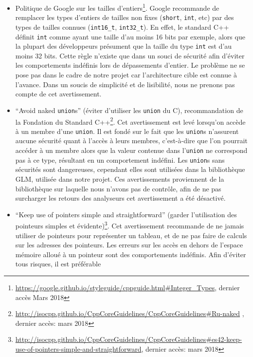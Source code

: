 \begin{itemize}
\item
  Politique de Google sur les tailles
  d'entiers\footnote{\url{https://google.github.io/styleguide/cppguide.html\#Integer_Types}, dernier accès Mars 2018}. Google recommande de remplacer
  les types d'entiers de tailles non fixes (\texttt{short},
  \texttt{int}, etc) par des types de tailles connues
  (\texttt{int16\_t}, \texttt{int32\_t}). En effet, le standard C++
  définit \texttt{int} comme ayant une taille d'au moins 16 bits par
  exemple, alors que la plupart des développeurs présument que la taille
  du type \texttt{int} est d'au moins 32 bits. Cette règle n'existe que
  dans un souci de sécurité afin d'éviter les comportements indéfinis
  lors de dépassements d'entier. Le problème ne se pose pas dans le cadre
  de notre projet car l'architecture cible est connue à l'avance. Dans
  un soucis de simplicité et de lisibilité, nous ne prenons pas compte
  de cet avertissement.
\item
  ``Avoid naked \texttt{union}s'' (éviter d'utiliser les \texttt{union}
  du C), recommandation de la Fondation du Standard
  C++\footnote{\url{http://isocpp.github.io/CppCoreGuidelines/CppCoreGuidelines\#Ru-naked} , dernier accès: mars 2018}. Cet avertissement est levé
  lorsqu'on accède à un membre d'une \texttt{union}. Il est fondé sur le
  fait que les \texttt{union}s n'assurent aucune sécurité quant à
  l'accès à leurs membres, c'est-à-dire que l'on pourrait accéder à un
  membre alors que la valeur contenue dans l'\texttt{union} ne
  correspond pas à ce type, résultant en un comportement indéfini. Les
  \texttt{union}s sans sécurités sont dangereuses, cependant elles sont
  utilisées dans la bibliothèque GLM, utilisée dans notre projet. Ces
  avertissements proviennent de la bibliothèque sur laquelle nous
  n'avons pas de contrôle, afin de ne pas surcharger les retours des
  analyseurs cet avertissement a été désactivé.
\item
  ``Keep use of pointers simple and straightforward'' (garder
  l'utilisation des pointeurs simples et
  évidente)\footnote{\url{http://isocpp.github.io/CppCoreGuidelines/CppCoreGuidelines\#es42-keep-use-of-pointers-simple-and-straightforward}, dernier accès: mars 2018}. Cet avertissement recommande de
  ne jamais utiliser de pointeurs pour représenter un tableau, et de ne
  pas faire de calculs sur les adresses des pointeurs. Les erreurs sur
  les accès en dehors de l'espace mémoire alloué à un pointeur sont des
  comportements indéfinis. Afin d'éviter tous risques, il est préférable

\end{itemize}
